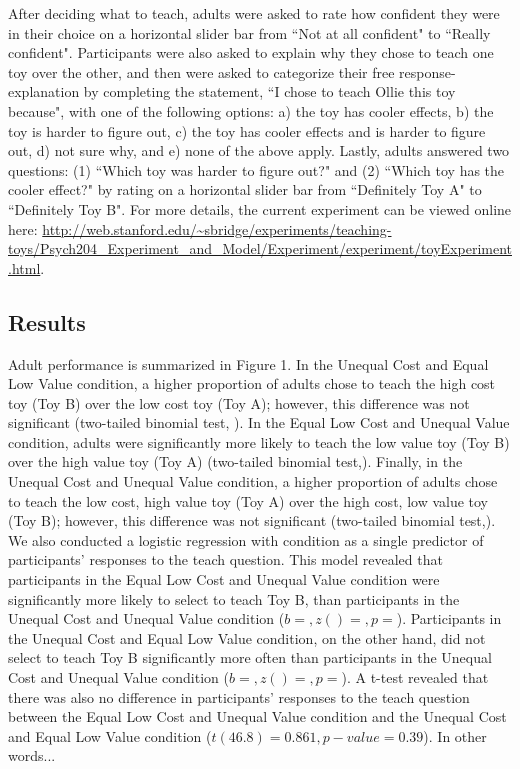 \documentclass[10pt,letterpaper]{article}
\begin{document}
After deciding what to teach, adults were asked to rate how confident they were in their choice on a horizontal slider bar from ``Not at all confident" to ``Really confident". Participants were also asked to explain why they chose to teach one toy over the other, and then were asked to categorize their free response-explanation by completing the statement, ``I chose to teach Ollie this toy because", with one of the following options: a) the toy has cooler effects, b) the toy is harder to figure out, c) the toy has cooler effects and is harder to figure out, d) not sure why, and e) none of the above apply. Lastly, adults answered two questions: (1) ``Which toy was harder to figure out?" and (2) ``Which toy has the cooler effect?" by rating on a horizontal slider bar from ``Definitely Toy A" to ``Definitely Toy B". For more details, the current experiment can be viewed online here:  \url{http://web.stanford.edu/~sbridge/experiments/teaching-toys/Psych204_Experiment_and_Model/Experiment/experiment/toyExperiment.html}.

\subsection{Results}

Adult performance is summarized in Figure 1. In the Unequal Cost and Equal Low Value condition, a higher proportion of adults chose to teach the high cost toy (Toy B) over the low cost toy (Toy A); however, this difference was not significant (two-tailed binomial test, ). In the Equal Low Cost and Unequal Value condition, adults were significantly more likely to teach the low value toy (Toy B) over the high value toy (Toy A) (two-tailed binomial test,). Finally, in the Unequal Cost and Unequal Value condition, a higher proportion of adults chose to teach the low cost, high value toy (Toy A) over the high cost, low value toy (Toy B); however, this difference was not significant (two-tailed binomial test,). We also conducted a logistic regression with condition as a single predictor of participants' responses to the teach question. This model revealed that participants in the Equal Low Cost and Unequal Value condition were significantly more likely to select to teach Toy B, than participants in the Unequal Cost and Unequal Value condition ($b = , z() = , p = $). Participants in the Unequal Cost and Equal Low Value condition, on the other hand, did not select to teach Toy B significantly more often than participants in the Unequal Cost and Unequal Value condition ($b = , z() = , p = $). A t-test revealed that there was also no difference in participants' responses to the teach question between the Equal Low Cost and Unequal Value condition and the Unequal Cost and Equal Low Value condition ($t(46.8) = 0.861,  p-value = 0.39$). In other words...
\end{document}
